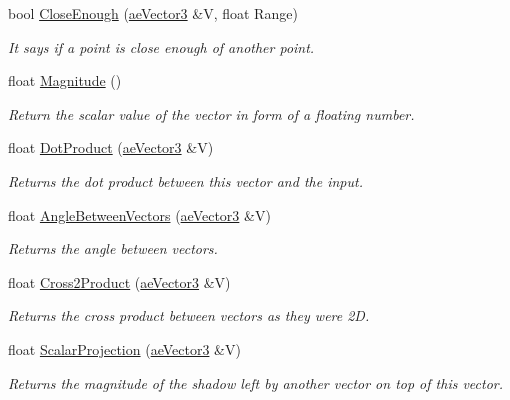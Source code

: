 \begin{DoxyCompactItemize}
\item 
bool \hyperlink{structae_core_1_1ae_vector3_a5a196d2e3ece1eb67de18e0dd8fbe0f0}{Close\+Enough} (\hyperlink{structae_core_1_1ae_vector3}{ae\+Vector3} \&V, float Range)
\begin{DoxyCompactList}\small\item\em It says if a point is close enough of another point. \end{DoxyCompactList}\item 
float \hyperlink{structae_core_1_1ae_vector3_add758370b650c955432048f711e3e4b2}{Magnitude} ()
\begin{DoxyCompactList}\small\item\em Return the scalar value of the vector in form of a floating number. \end{DoxyCompactList}\item 
float \hyperlink{structae_core_1_1ae_vector3_a181070166a463a9622a562341f62bdb2}{Dot\+Product} (\hyperlink{structae_core_1_1ae_vector3}{ae\+Vector3} \&V)
\begin{DoxyCompactList}\small\item\em Returns the dot product between this vector and the input. \end{DoxyCompactList}\item 
float \hyperlink{structae_core_1_1ae_vector3_a469e4d42ba109c4f1077434a7a97792a}{Angle\+Between\+Vectors} (\hyperlink{structae_core_1_1ae_vector3}{ae\+Vector3} \&V)
\begin{DoxyCompactList}\small\item\em Returns the angle between vectors. \end{DoxyCompactList}\item 
float \hyperlink{structae_core_1_1ae_vector3_abebbe7583cf4bcf08da988f4f72e6c84}{Cross2\+Product} (\hyperlink{structae_core_1_1ae_vector3}{ae\+Vector3} \&V)
\begin{DoxyCompactList}\small\item\em Returns the cross product between vectors as they were 2D. \end{DoxyCompactList}\item 
float \hyperlink{structae_core_1_1ae_vector3_a02fe6581b4ab65efbd03cd76196bd364}{Scalar\+Projection} (\hyperlink{structae_core_1_1ae_vector3}{ae\+Vector3} \&V)
\begin{DoxyCompactList}\small\item\em Returns the magnitude of the shadow left by another vector on top of this vector. \end{DoxyCompactList}\item 

\end{DoxyCompactItemize}
